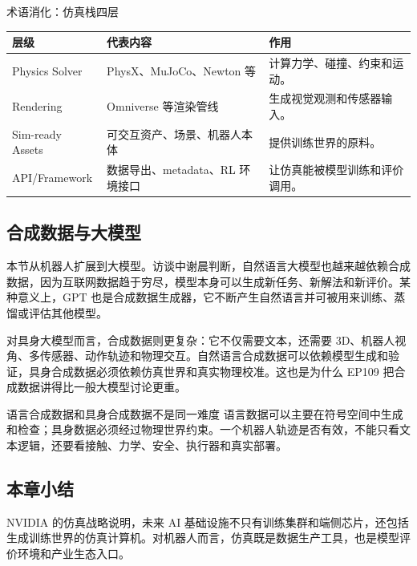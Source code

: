 \begin{knowledgebox}{术语消化：仿真栈四层}
\begin{tabularx}{\textwidth}{p{}p{}X}
\toprule
层级 & 代表内容 & 作用 \\
\midrule
Physics Solver & PhysX、MuJoCo、Newton 等 & 计算力学、碰撞、约束和运动。 \\
Rendering & Omniverse 等渲染管线 & 生成视觉观测和传感器输入。 \\
Sim-ready Assets & 可交互资产、场景、机器人本体 & 提供训练世界的原料。 \\
API/Framework & 数据导出、metadata、RL 环境接口 & 让仿真能被模型训练和评价调用。 \\
\bottomrule
\end{tabularx}
\end{knowledgebox}

\subsection{合成数据与大模型}

本节从机器人扩展到大模型。访谈中谢晨判断，自然语言大模型也越来越依赖合成数据，因为互联网数据趋于穷尽，模型本身可以生成新任务、新解法和新评价。某种意义上，GPT 也是合成数据生成器，它不断产生自然语言并可被用来训练、蒸馏或评估其他模型。

对具身大模型而言，合成数据则更复杂：它不仅需要文本，还需要 3D、机器人视角、多传感器、动作轨迹和物理交互。自然语言合成数据可以依赖模型生成和验证，具身合成数据必须依赖仿真世界和真实物理校准。这也是为什么 EP109 把合成数据讲得比一般大模型讨论更重。

\begin{warningbox}{语言合成数据和具身合成数据不是同一难度}
语言数据可以主要在符号空间中生成和检查；具身数据必须经过物理世界约束。一个机器人轨迹是否有效，不能只看文本逻辑，还要看接触、力学、安全、执行器和真实部署。
\end{warningbox}

\subsection{本章小结}

NVIDIA 的仿真战略说明，未来 AI 基础设施不只有训练集群和端侧芯片，还包括生成训练世界的仿真计算机。对机器人而言，仿真既是数据生产工具，也是模型评价环境和产业生态入口。

